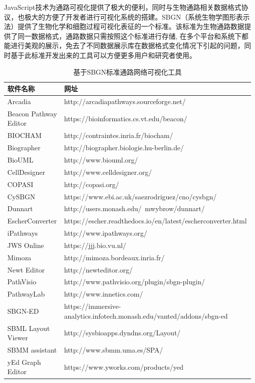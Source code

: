 JavaScript技术为通路可视化提供了极大的便利，同时与生物通路相关数据格式协议，也极大的方便了开发者进行可视化系统的搭建。SBGN\cite{}（系统生物学图形表示法）提供了生物化学和细胞过程可视化表征的一个标准。该标准为生物通路数据提供了同一数据格式，通路数据只需按照这个标准进行存储, 在多个平台和系统下都能进行美观的展示，免去了不同数据展示库在数据格式变化情况下引起的问题，同时基于此标准开发出来的工具可以方便更多用户和研究者使用。

\begin{table}[htbp]
  \centering
	\caption[table2]{基于SBGN标准通路网络可视化工具}
\vspace{0.5em}\wuhao
\begin{tabularx}{1.0\textwidth}{lX}
\toprule[1.5pt]
软件名称 & 网址 \\
\midrule[1pt]
Arcadia	 &  http://arcadiapathways.sourceforge.net/\\
Beacon Pathway Editor	 & https://bioinformatics.cs.vt.edu/beacon/\\
BIOCHAM	 & http://contraintes.inria.fr/biocham/\\
Biographer	 & http://biographer.biologie.hu-berlin.de/\\
BioUML	& http://www.biouml.org/\\
CellDesigner & http://www.celldesigner.org/\\
COPASI	& http://copasi.org/\\
CySBGN	 & https://www.ebi.ac.uk/saezrodriguez/cno/cysbgn/\\
Dunnart	 & http://users.monash.edu/~mwybrow/dunnart/\\
EscherConverter		& https://escher.readthedocs.io/en/latest/escherconverter.html\\
iPathways	 & http://www.ipathways.org/\\
JWS Online	& https://jjj.bio.vu.nl/\\
Mimoza	 & http://mimoza.bordeaux.inria.fr/\\
Newt Editor	& http://newteditor.org/\\
PathVisio	& http://www.pathvisio.org/plugin/sbgn-plugin/\\
PathwayLab	& http://www.innetics.com/\\
SBGN-ED	  & https://immersive-analytics.infotech.monash.edu/vanted/addons/sbgn-ed \\
SBML Layout Viewer	 & http://sysbioapps.dyndns.org/Layout/\\
SBMM assistant	 & http://www.sbmm.uma.es/SPA/\\
yEd Graph Editor	& https://www.yworks.com/products/yed\\

\bottomrule[1.5pt]
\end{tabularx}
\end{table}

